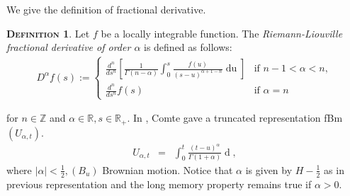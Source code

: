 \documentclass[a4paper, twoside, 11pt]{article}
\theoremstyle{definition}
\newtheorem{definition}{\scshape Definition}[section]
\begin{document}
  We give the definition of fractional derivative.
  \begin{definition}
	Let $f$ be a locally integrable function. The \emph{Riemann-Liouville \\fractional derivative of order $\alpha$} is defined as follows:
  \begin{eqnarray}
	D^\alpha f(s) := \begin{cases} \frac{d^n}{ds^n}[\frac{1}{\Gamma(n-\alpha)}\int_0^s \frac{f(u)}{(s-u)^{\alpha + 1 - n}}\mathop{du}] &\mbox{if } n-1 < \alpha < n,\\
	  \frac{d^n}{ds^n} f(s) & \mbox{if } \alpha=n
	\end{cases}
	\label{sec:frader}
  \end{eqnarray}
  \end{definition}
  for $n \in \mathbb{Z}$ and $\alpha \in \mathbb{R}, s \in \mathbb{R}_+ $.
  In \cite{comte}, Comte gave a truncated representation fBm $(U_{\alpha,t})$.
  \begin{eqnarray}
	U_{\alpha,t} &=& \int_0^t \frac{(t-u)^\alpha}{\Gamma(1+\alpha)}\mathop{dB_u}, 
	\label{<sec:cc1>}
  \end{eqnarray}
  where $|\alpha| < \frac{1}{2}, (B_u)$ Brownian motion. Notice that $\alpha$ is given by $H-\frac{1}{2}$ as in previous representation and the long memory property remains true if $\alpha>0$.
\end{document}
